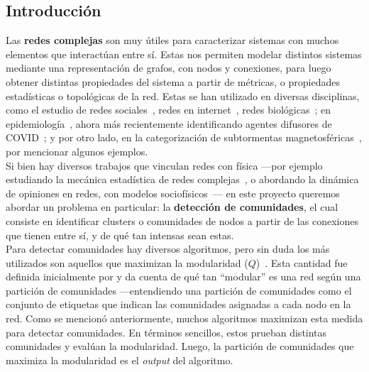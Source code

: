 \documentclass[hyperref]{proyectotesis}
\begin{document}
\subsection{Introducción}
Las \textbf{redes complejas} son muy útiles para caracterizar sistemas con muchos elementos que interactúan entre sí. Estas nos permiten modelar distintos sistemas mediante una representación de grafos, con nodos y conexiones, para luego obtener distintas propiedades del sistema a partir de métricas, o propiedades estadísticas o topológicas de la red. Estas se han utilizado en diversas disciplinas, como el estudio de redes sociales~\cite{newman_structure_2003, cantwell_friendship_2021}, redes en internet~\cite{newman_structure_2003}, redes biológicas~\cite{newman_structure_2003, da_fontoura_costa_complex_2008}; en epidemiología~\cite{karrer_competing_2011}, ahora más recientemente identificando agentes difusores de COVID~\cite{montes-orozco_identification_2020}; y por otro lado, en la categorización de subtormentas magnetosféricas~\cite{dods_network_2015}, por mencionar algunos ejemplos.\\

Si bien hay diversos trabajos que vinculan redes con física ---por ejemplo estudiando la mecánica estadística de redes complejas~\cite{albert_statistical_2001, pastor-satorras_statistical_2003}, o abordando la dinámica de opiniones en redes, con modelos sociofísicos~\cite{suchecki_conservation_2005, castellano_statistical_2009}--- en este proyecto queremos abordar un problema en particular: la \textbf{detección de comunidades}, el cual consiste en identificar clusters o comunidades de nodos a partir de las conexiones que tienen entre sí, y de qué tan intensas sean estas.\\


Para detectar comunidades hay diversos algoritmos, pero sin duda los más utilizados son aquellos que maximizan la modularidad ($Q$)~\cite{newman_fast_2004, clauset_finding_2004, duch_community_2005, blondel_fast_2008, arab_modularity_2012, chen_community_2014}. Esta cantidad fue definida inicialmente por \citet{newman_finding_2004} y da cuenta de qué tan ``modular'' es una red según una partición de comunidades ---entendiendo una partición de comunidades como el conjunto de etiquetas que indican las comunidades asignadas a cada nodo en la red. Como se mencionó anteriormente, muchos algoritmos maximizan esta medida para detectar comunidades. En términos sencillos, estos prueban distintas comunidades y evalúan la modularidad. Luego, la partición de comunidades que maximiza la modularidad es el \textit{output} del algoritmo.\\
\end{document}

